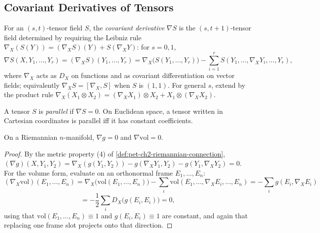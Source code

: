 \subsection{Covariant Derivatives of Tensors}

\begin{definition}
  \label{def:pet-ch2-covariant-derivative-tensor}
  \leanok
  For an $(s,t)$-tensor field $S$, the \emph{covariant derivative} $\nabla S$
  is the $(s,t+1)$-tensor field determined by requiring the Leibniz rule
  $\nabla_X(S(Y))=(\nabla_XS)(Y)+S(\nabla_XY)$: for $s=0,1$,
  \[
    \nabla S(X,Y_1,\dots,Y_r)=(\nabla_XS)(Y_1,\dots,Y_r)
    =\nabla_X\big(S(Y_1,\dots,Y_r)\big)-\sum_{i=1}^rS(Y_1,\dots,\nabla_XY_i,\dots,Y_r),
  \]
  where $\nabla_X$ acts as $D_X$ on functions and as covariant differentiation
  on vector fields; equivalently $\nabla_XS=[\nabla_X,S]$ when $S$ is
  $(1,1)$. For general $s$, extend by the product rule
  $\nabla_X(X_1\otimes X_2)=(\nabla_XX_1)\otimes X_2+X_1\otimes(\nabla_XX_2)$.
\end{definition}

\begin{definition}
  \label{def:pet-ch2-parallel-tensor}
  \leanok
  A tensor $S$ is \emph{parallel} if $\nabla S=0$. On Euclidean space, a
  tensor written in Cartesian coordinates is parallel iff it has constant
  coefficients.
\end{definition}

\begin{proposition}
  \label{prop:pet-ch2-metric-volume-parallel}
  \leanok
  On a Riemannian $n$-manifold, $\nabla g=0$ and $\nabla\mathrm{vol}=0$.
\end{proposition}
\begin{proof}
  \leanok
  By the metric property (4) of \cref{def:pet-ch2-riemannian-connection},
  $(\nabla g)(X,Y_1,Y_2)=\nabla_X(g(Y_1,Y_2))-g(\nabla_XY_1,Y_2)-g(Y_1,\nabla_XY_2)=0$.
  For the volume form, evaluate on an orthonormal frame $E_1,\dots,E_n$:
  \[
    (\nabla_X\mathrm{vol})(E_1,\dots,E_n)
    = \nabla_X\big(\mathrm{vol}(E_1,\dots,E_n)\big)-\sum_i\mathrm{vol}(E_1,\dots,\nabla_XE_i,\dots,E_n)
    = -\sum_ig(E_i,\nabla_XE_i)
  \]
  \[
    = -\frac12\sum_iD_X\big(g(E_i,E_i)\big) = 0,
  \]
  using that $\mathrm{vol}(E_1,\dots,E_n)\equiv1$ and $g(E_i,E_i)\equiv1$ are
  constant, and again that replacing one frame slot projects onto that
  direction.
\end{proof}

